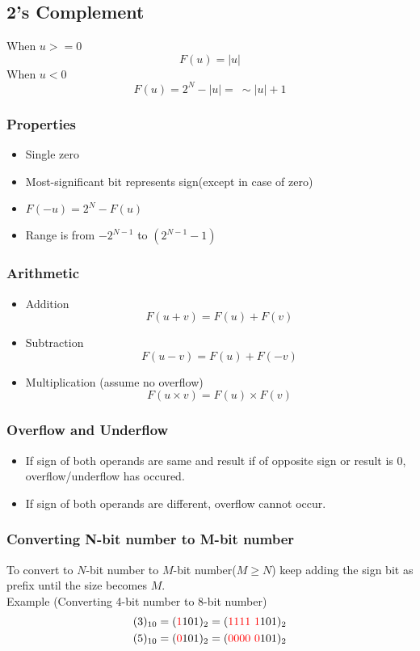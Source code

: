 \documentclass[oneside]{book}
\begin{document}
\subsection{2's Complement}
When \(u >= 0\)
\[
	F(u) = |u|
\]
When \(u < 0\)
\[
	F(u) = 2^N - |u| =\ \sim|u| + 1
\]
\subsubsection{Properties}
\begin{itemize}
	\item Single zero
	\item Most-significant bit represents sign(except in case of zero)
	\item \(F(-u) = 2^N - F(u)\)
	\item Range is from \(-2^{N-1}\) to \((2^{N-1} - 1)\)
\end{itemize}

\subsubsection{Arithmetic}
\begin{itemize}
	\item Addition
	      \[
		      F(u+v) = F(u) + F(v)
	      \]
	\item Subtraction
	      \[
		      F(u-v) = F(u) + F(-v)
	      \]
	\item Multiplication (assume no overflow)
	      \[
		      F(u\times v) = F(u)\times F(v)
	      \]
\end{itemize}
\subsubsection{Overflow and Underflow}
\begin{itemize}
	\item If sign of both operands are same and result if of opposite sign or result is 0, overflow/underflow has occured.
	\item If sign of both operands are different, overflow cannot occur.
\end{itemize}

\subsubsection{Converting N-bit number to M-bit number}
To convert to \(N\)-bit number to \(M\)-bit number(\(M\geq N\)) keep adding the sign bit as prefix until the size becomes \(M\).
\\
Example (Converting 4-bit number to 8-bit number)
\begin{align*}
	(3)_{10} = (\textcolor{red}{1}101)_2 = (\textcolor{red}{1111\ 1}101)_2 \\
	(5)_{10} = (\textcolor{red}{0}101)_2 = (\textcolor{red}{0000\ 0}101)_2
\end{align*}
\end{document}
